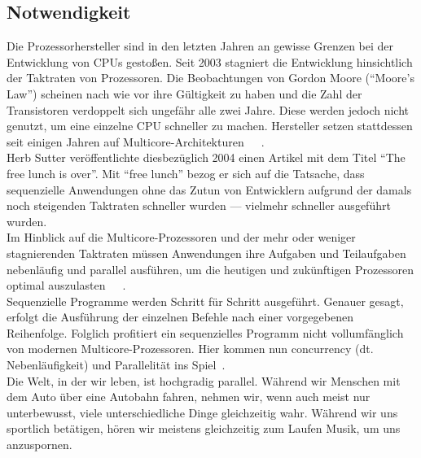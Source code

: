 \subsection{Notwendigkeit}\label{subsec:notwendigkeit}
Die Prozessorhersteller sind in den letzten Jahren an gewisse Grenzen bei der Entwicklung von CPUs gestoßen. Seit 2003 stagniert die Entwicklung hinsichtlich der Taktraten von Prozessoren. Die Beobachtungen von Gordon Moore (\enquote{Moore's Law}) scheinen nach wie vor ihre Gültigkeit zu haben und die Zahl der Transistoren verdoppelt sich ungefähr alle zwei Jahre. Diese werden jedoch nicht genutzt, um eine einzelne CPU schneller zu machen. Hersteller setzen stattdessen seit einigen Jahren auf Multicore-Architekturen~\cite[S.~1]{butcher_seven_2014}~\cite[S.~108]{vernon_reactive_2016}~\cite{sutter_free_2004}.\\
Herb Sutter veröffentlichte diesbezüglich 2004 einen Artikel mit dem Titel \enquote{The free lunch is over}. Mit \enquote{free lunch} bezog er sich auf die Tatsache, dass sequenzielle Anwendungen ohne das Zutun von Entwicklern aufgrund der damals noch steigenden Taktraten schneller wurden --- vielmehr schneller ausgeführt wurden.\\
Im Hinblick auf die Multicore-Prozessoren und der mehr oder weniger stagnierenden Taktraten müssen Anwendungen ihre Aufgaben und Teilaufgaben nebenläufig und parallel ausführen, um die heutigen und zukünftigen Prozessoren optimal auszulasten~\cite[S.~45]{kuhn_reactive_2015}~\cite{sutter_free_2004}~\cite[S.~1]{butcher_seven_2014}.\\
Sequenzielle Programme werden Schritt für Schritt ausgeführt. Genauer gesagt, erfolgt die Ausführung der einzelnen Befehle nach einer vorgegebenen Reihenfolge. Folglich profitiert ein sequenzielles Programm nicht vollumfänglich von modernen Multicore-Prozessoren. Hier kommen nun \gls{concurrency} (dt. Nebenläufigkeit) und Parallelität ins Spiel~\cite[S.~3]{butcher_seven_2014}.\\

Die Welt, in der wir leben, ist hochgradig parallel. Während wir Menschen mit dem Auto über eine Autobahn fahren, nehmen wir, wenn auch meist nur unterbewusst, viele unterschiedliche Dinge gleichzeitig wahr. Während wir uns sportlich betätigen, hören wir meistens gleichzeitig zum Laufen Musik, um uns anzuspornen.\\

